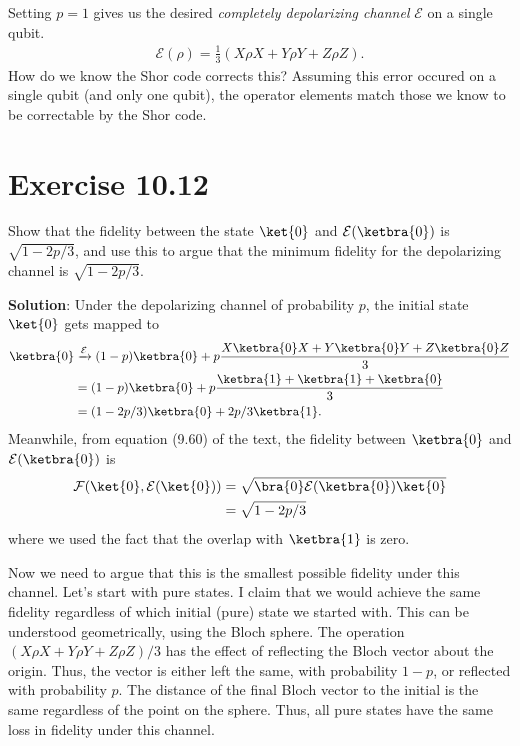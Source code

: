 \documentclass{book}
\newcommand{\mc}[1]{\mathcal{#1}}
\begin{document}
    Setting $p = 1$ gives us the desired \emph{completely depolarizing channel} $\mc{E}$ on a single qubit.
    \begin{align}
        \mc{E}(\rho) = \frac{1}{3} (X \rho X + Y \rho Y + Z\rho Z).
    \end{align}
    How do we know the Shor code corrects this? Assuming this error occured on a single qubit (and only one qubit), the operator elements match those we know to be correctable by the Shor code. 

\section*{Exercise 10.12}
    Show that the fidelity between the state $\ket{0}$ and $\mathcal{E}(\ketbra{0})$ is $\sqrt{1-2p/3}$, and use this to argue that the minimum fidelity for the depolarizing channel is $\sqrt{1-2p/3}$.

    \textbf{Solution}: Under the depolarizing channel of probability $p$, the initial state $\ket{0}$ gets mapped to 
    \begin{align}
    \begin{aligned}
        \ketbra{0} &\xrightarrow{\mathcal{E}} (1-p) \ketbra{0} + p \frac{X \ketbra{0} X + Y \ketbra{0} Y + Z \ketbra{0} Z}{3} \\
        &= (1-p) \ketbra{0} + p \frac{\ketbra{1} + \ketbra{1} + \ketbra{0}}{3} \\
        &= (1 - 2p/3) \ketbra{0} + 2p/3 \ketbra{1}.
    \end{aligned}
    \end{align}
    Meanwhile, from equation (9.60) of the text, the fidelity between $\ketbra{0}$ and $\mathcal{E}(\ketbra{0})$ is
    \begin{align}
    \begin{aligned}
        \mathcal{F}(\ket{0}, \mathcal{E}(\ket{0})) &= \sqrt{\bra{0} \mathcal{E}(\ketbra{0}) \ket{0}} \\
        &= \sqrt{1 - 2p/3}
    \end{aligned}
    \end{align}
    where we used the fact that the overlap with $\ketbra{1}$ is zero.

    Now we need to argue that this is the smallest possible fidelity under this channel. Let's start with pure states. I claim that we would achieve the same fidelity regardless of which initial (pure) state we started with. This can be understood geometrically, using the Bloch sphere. The operation $(X\rho X + Y\rho Y + Z\rho Z)/3$ has the effect of reflecting the Bloch vector about the origin. Thus, the vector is either left the same, with probability $1-p$, or reflected with probability $p$. The distance of the final Bloch vector to the initial is the same regardless of the point on the sphere. Thus, all pure states have the same loss in fidelity under this channel.
\end{document}
